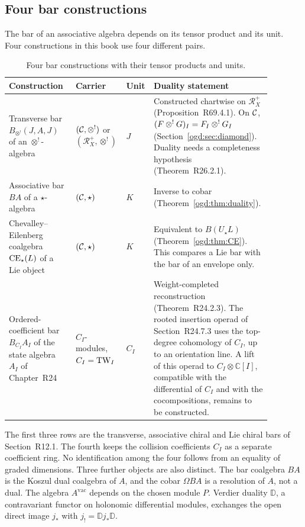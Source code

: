 \subsection{Four bar constructions}

The bar of an associative algebra depends on its tensor product and its unit.
Four constructions in this book use four different pairs.

\begin{table}[ht]
\centering
\small
\begin{tabular}{@{}>{\raggedright\arraybackslash}p{0.25\linewidth}>{\raggedright\arraybackslash}p{0.18\linewidth}>{\raggedright\arraybackslash}p{0.06\linewidth}>{\raggedright\arraybackslash}p{0.39\linewidth}@{}}
\toprule
Construction & Carrier & Unit & Duality statement\\
\midrule
Transverse bar \(B_{\otimes^!}(J,A,J)\) of an \(\otimes^!\)-algebra
 & \((\mathcal C,\mathbin{\otimes^!})\) or \((\mathcal R_X^+,\otimes^!)\) & \(J\)
 & Constructed chartwise on \(\mathcal R_X^+\) (Proposition~\textup{R69.4.1}). On \(\mathcal C\), \((F\mathbin{\otimes^!} G)_I=F_I\mathbin{\otimes^!} G_I\) (Section~\ref{ogd:sec:diamond}). Duality needs a completeness hypothesis (Theorem~\textup{R26.2.1}).\\
Associative bar \(BA\) of a \(\star\)-algebra
 & \((\mathcal C,\star)\) & \(K\)
 & Inverse to cobar (Theorem~\ref{ogd:thm:duality}).\\
Chevalley--Eilenberg coalgebra \(\operatorname{CE}_\star(L)\) of a Lie object
 & \((\mathcal C,\star)\) & \(K\)
 & Equivalent to \(B(U_\star L)\) (Theorem~\ref{ogd:thm:CE}). This compares a Lie bar with the bar of an envelope only.\\
Ordered-coefficient bar \(B_{C_I}A_I\) of the state algebra \(A_I\) of Chapter~\textup{R24}
 & \(C_I\)-modules, \(C_I=\operatorname{TW}_I\) & \(C_I\)
 & Weight-completed reconstruction (Theorem~\textup{R24.2.3}). The rooted insertion operad of Section~\textup{R24.7.3} uses the top-degree cohomology of \(C_I\), up to an orientation line. A lift of this operad to \(C_I\otimes\mathbb C[I]\), compatible with the differential of \(C_I\) and with the cocompositions, remains to be constructed.\\
\bottomrule
\end{tabular}
\caption{Four bar constructions with their tensor products and units.}
\label{ogd:tab:bars}
\end{table}

The first three rows are the transverse, associative chiral and Lie chiral bars of Section~\textup{R12.1}.
The fourth keeps the collision coefficients \(C_I\) as a separate coefficient ring.
No identification among the four follows from an equality of graded dimensions.
Three further objects are also distinct.
The\label{ogd:def:bar-coalgebra-versus-cobar-resolution} bar coalgebra \(BA\) is the Koszul dual coalgebra of \(A\), and the cobar \(\Omega BA\) is a resolution of \(A\), not a dual.
The algebra \(A^{\mathrm{vac}}\) depends on the chosen module \(P\).
Verdier duality \(\mathbb D\), a contravariant functor on holonomic differential modules, exchanges the open direct image \(j_*\) with \(j_!=\mathbb Dj_*\mathbb D\).

